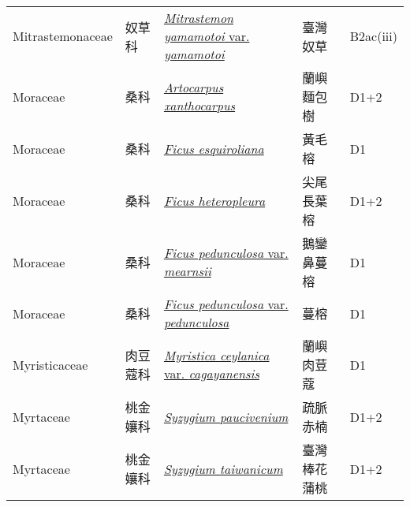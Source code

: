 {\begin{longtable}{p{2.5cm}p{2cm}p{5cm}p{2.5cm}p{3cm}}
    Mitrastemonaceae & 奴草科 & \href{http://www.theplantlist.org/tpl1.1/search?q=Mitrastemon+yamamotoi+var.+yamamotoi}{\textit{Mitrastemon yamamotoi} var. \textit{yamamotoi} } & 臺灣奴草 & B2ac(iii) \index{Mitrastemon@\textit{Mitrastemon}!yamamotoi@\textit{yamamotoi}!var. yamamotoi@var. \textit{yamamotoi}}  \index{臺灣奴草} \\
    Moraceae & 桑科 & \href{http://www.theplantlist.org/tpl1.1/search?q=Artocarpus+xanthocarpus}{\textit{Artocarpus xanthocarpus} } & 蘭嶼麵包樹 & D1+2 \index{Artocarpus@\textit{Artocarpus}!xanthocarpus@\textit{xanthocarpus}}  \index{蘭嶼麵包樹} \\
    Moraceae & 桑科 & \href{http://www.theplantlist.org/tpl1.1/search?q=Ficus+esquiroliana}{\textit{Ficus esquiroliana} } & 黃毛榕 & D1 \index{Ficus@\textit{Ficus}!esquiroliana@\textit{esquiroliana}}  \index{黃毛榕} \\
    Moraceae & 桑科 & \href{http://www.theplantlist.org/tpl1.1/search?q=Ficus+heteropleura}{\textit{Ficus heteropleura} } & 尖尾長葉榕 & D1+2 \index{Ficus@\textit{Ficus}!heteropleura@\textit{heteropleura}}  \index{尖尾長葉榕} \\
    Moraceae & 桑科 & \href{http://www.theplantlist.org/tpl1.1/search?q=Ficus+pedunculosa+var.+mearnsii}{\textit{Ficus pedunculosa} var. \textit{mearnsii} } & 鵝鑾鼻蔓榕 & D1 \index{Ficus@\textit{Ficus}!pedunculosa@\textit{pedunculosa}!var. mearnsii@var. \textit{mearnsii}}  \index{鵝鑾鼻蔓榕} \\
    Moraceae & 桑科 & \href{http://www.theplantlist.org/tpl1.1/search?q=Ficus+pedunculosa+var.+pedunculosa}{\textit{Ficus pedunculosa} var. \textit{pedunculosa} } & 蔓榕 & D1 \index{Ficus@\textit{Ficus}!pedunculosa@\textit{pedunculosa}!var. pedunculosa@var. \textit{pedunculosa}}  \index{蔓榕} \\
    Myristicaceae & 肉豆蔻科 & \href{http://www.theplantlist.org/tpl1.1/search?q=Myristica+ceylanica+var.+cagayanensis}{\textit{Myristica ceylanica} var. \textit{cagayanensis} } & 蘭嶼肉荳蔻 & D1 \index{Myristica@\textit{Myristica}!ceylanica@\textit{ceylanica}!var. cagayanensis@var. \textit{cagayanensis}}  \index{蘭嶼肉荳蔻} \\
    Myrtaceae & 桃金孃科 & \href{http://www.theplantlist.org/tpl1.1/search?q=Syzygium+paucivenium}{\textit{Syzygium paucivenium} } & 疏脈赤楠 & D1+2 \index{Syzygium@\textit{Syzygium}!paucivenium@\textit{paucivenium}}  \index{疏脈赤楠} \\
    Myrtaceae & 桃金孃科 & \href{http://www.theplantlist.org/tpl1.1/search?q=Syzygium+taiwanicum}{\textit{Syzygium taiwanicum} } & 臺灣棒花蒲桃 & D1+2 \index{Syzygium@\textit{Syzygium}!taiwanicum@\textit{taiwanicum}}  \index{臺灣棒花蒲桃} \\

\end{longtable}}
